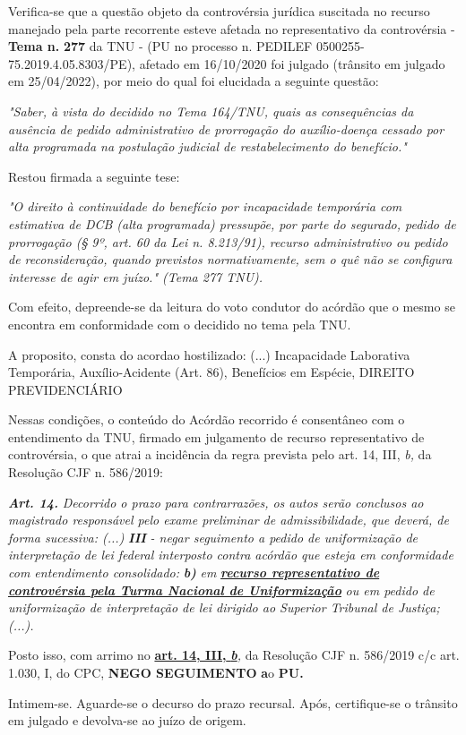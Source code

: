 \documentclass[12pt]{article}
\begin{document}
\justifying
\noindent Verifica-se que a questão objeto da controvérsia jurídica suscitada no recurso manejado pela parte recorrente esteve afetada no representativo da controvérsia - \textbf{Tema n. }\textbf{277} da TNU - (PU no processo n. PEDILEF 0500255-75.2019.4.05.8303/PE),  afetado em 16/10/2020 foi julgado (trânsito em julgado em 25/04/2022), por meio do qual foi elucidada a seguinte questão:

\noindent \textit{"Saber, à vista do decidido no Tema 164/TNU, quais as consequências da ausência de pedido administrativo de prorrogação do auxílio-doença cessado por alta programada na postulação judicial de restabelecimento do benefício."}

\noindent Restou firmada a seguinte tese:

\noindent \textit{"O direito à continuidade do benefício por incapacidade temporária com estimativa de DCB (alta programada) pressupõe, por parte do segurado, pedido de prorrogação (§ 9º, art. 60 da Lei n. 8.213/91), recurso administrativo ou pedido de reconsideração, quando previstos normativamente, sem o quê não se configura interesse de agir em juízo." (Tema 277 TNU).}

\noindent Com efeito, depreende-se da leitura do voto condutor do acórdão que o mesmo se encontra em conformidade com o decidido no  tema pela TNU.

\noindent A proposito, consta do acordao hostilizado: (...) Incapacidade Laborativa Temporária, Auxílio-Acidente (Art. 86), Benefícios em Espécie, DIREITO PREVIDENCIÁRIO

\noindent Nessas condições, o conteúdo do Acórdão recorrido é consentâneo com o entendimento da TNU, firmado em julgamento de recurso representativo de controvérsia, o que atrai a incidência da regra prevista pelo art. 14, III, \textit{b,} da Resolução CJF n. 586/2019:

\noindent \textit{\textbf{Art. 14.}}\textit{ Decorrido o prazo para contrarrazões, os autos serão conclusos ao magistrado responsável pelo exame preliminar de admissibilidade, que deverá, de forma sucessiva: (...) }\textit{\textbf{III }}\textit{- negar seguimento a pedido de uniformização de interpretação de lei federal interposto contra acórdão que esteja em conformidade com entendimento consolidado: }\textit{\textbf{b)}}\textit{ em }\uline{\textit{\textbf{recurso representativo de controvérsia pela Turma Nacional de Uniformização}}}\textit{ ou em pedido de uniformização de interpretação de lei dirigido ao Superior Tribunal de Justiça;(...).}

\noindent Posto isso, com arrimo no \uline{\textbf{art. 14, III, }}\uline{\textit{\textbf{b}}}\textit{,} da Resolução CJF n. 586/2019 c/c art. 1.030, I, do CPC, \textbf{NEGO SEGUIMENTO }\textbf{a}o\textbf{ PU}\textbf{.}

\noindent Intimem-se. Aguarde-se o decurso do prazo recursal. Após, certifique-se o trânsito em julgado e devolva-se ao juízo de origem.
\end{document}

